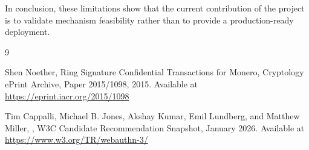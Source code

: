 \documentclass[letterpaper,11pt]{article}
\begin{document}
In conclusion, these limitations show that the current contribution of the project is to validate mechanism feasibility rather than to provide a production-ready deployment.

\newpage

\begin{thebibliography}{9}

Shen Noether,
\newblock Ring Signature Confidential Transactions for Monero,
\newblock Cryptology {ePrint} Archive, Paper 2015/1098, 2015.
\newblock Available at \url{https://eprint.iacr.org/2015/1098}

Tim Cappalli, Michael B. Jones, Akshay Kumar, Emil Lundberg, and Matthew Miller,
,
\newblock W3C Candidate Recommendation Snapshot, January 2026.
\newblock Available at \url{https://www.w3.org/TR/webauthn-3/}

\end{thebibliography}

\end{document}
